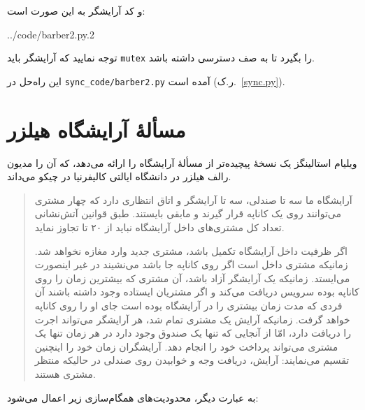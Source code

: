 \documentclass{book}
\newcommand{\clearemptydoublepage}{}%
\begin{document}
	و کد آرایشگر به این صورت است:

\begin{latin}

{../code/barber2.py.2}
\end{latin}

	توجه نمایید که آرایشگر باید {\tt mutex} را بگیرد تا به صف دسترسی داشته باشد.

	این راه‌حل در \verb"sync_code/barber2.py" آمده است (ر.ک.~\ref{sync.py}).

\clearemptydoublepage
\section {مسألهٔ آرایشگاه هیلزر}

	ویلیام استالینگز \cite{stallings}  
	یک نسخهٔ پیچیده‌تر از مسألهٔ آرایشگاه را ارائه می‌دهد، 
	که آن را مدیون رالف هیلزر در دانشگاه ایالتی کالیفرنیا در چیکو می‌داند.

\begin{quotation}
    آرایشگاه ما سه تا صندلی،‌ سه تا آرایشگر و اتاق انتظاری دارد که  چهار مشتری می‌توانند روی یک کاناپه قرار گیرند و مابقی بایستند. 
    طبق قوانین آتش‌نشانی تعداد کل مشتری‌های داخل آرایشگاه نباید از ۲۰ تا تجاوز نماید. 
    
    اگر ظرفیت داخل آرایشگاه تکمیل باشد، مشتری جدید وارد مغازه نخواهد شد. 
    زمانیکه مشتری داخل است اگر روی کاناپه جا باشد می‌نشیند در غیر اینصورت می‌ایستد. 
    زمانیکه یک آرایشگر آزاد باشد، آن مشتری که بیشترین زمان را روی کاناپه بوده  سرویس دریافت می‌کند و اگر مشتریان ایستاده وجود داشته باشند 
    آن فردی که مدت زمان بیشتری را در آرایشگاه بوده است جای او را روی کاناپه خواهد گرفت. 
    زمانیکه آرایش یک مشتری تمام شد،‌ هر آرایشگر می‌تواند اجرت را دریافت دارد،‌ امّا از آنجایی که تنها یک صندوق وجود دارد
    در هر زمان تنها یک مشتری می‌تواند پرداخت خود را انجام دهد. 
    آرایشگران زمان خود را اینچنین تقسیم می‌نمایند: آرایش، دریافت وجه و خوابیدن روی صندلی در حالیکه منتظر مشتری هستند.
\end{quotation}

    به عبارت دیگر، محدودیت‌های همگام‌سازی زیر اعمال می‌شود:
\end{document}
